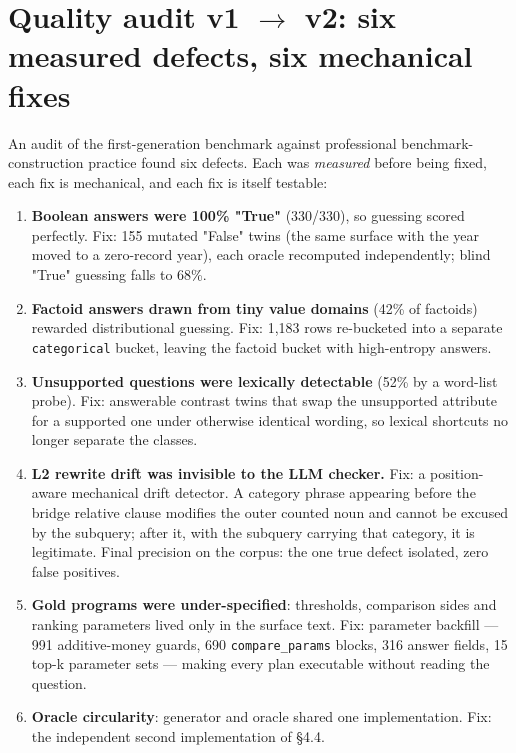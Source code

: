 \section{Quality audit v1 $\rightarrow$ v2: six measured defects, six mechanical fixes}\label{sec:quality-audit-v1-v2-six-measured-defects}

An audit of the first-generation benchmark against professional benchmark-construction practice found six defects. Each was \emph{measured} before being fixed, each fix is mechanical, and each fix is itself testable:

\begin{enumerate}
\item \textbf{Boolean answers were 100\% "True"} (330/330), so guessing scored perfectly. Fix: 155 mutated "False" twins (the same surface with the year moved to a zero-record year), each oracle recomputed independently; blind "True" guessing falls to 68\%.
\item \textbf{Factoid answers drawn from tiny value domains} (42\% of factoids) rewarded distributional guessing. Fix: 1,183 rows re-bucketed into a separate \texttt{categorical} bucket, leaving the factoid bucket with high-entropy answers.
\item \textbf{Unsupported questions were lexically detectable} (52\% by a word-list probe). Fix: answerable contrast twins that swap the unsupported attribute for a supported one under otherwise identical wording, so lexical shortcuts no longer separate the classes.
\item \textbf{L2 rewrite drift was invisible to the LLM checker.} Fix: a position-aware mechanical drift detector. A category phrase appearing before the bridge relative clause modifies the outer counted noun and cannot be excused by the subquery; after it, with the subquery carrying that category, it is legitimate. Final precision on the corpus: the one true defect isolated, zero false positives.
\item \textbf{Gold programs were under-specified}: thresholds, comparison sides and ranking parameters lived only in the surface text. Fix: parameter backfill --- 991 additive-money guards, 690 \texttt{compare\_params} blocks, 316 answer fields, 15 top-k parameter sets --- making every plan executable without reading the question.
\item \textbf{Oracle circularity}: generator and oracle shared one implementation. Fix: the independent second implementation of §4.4.
\end{enumerate}

